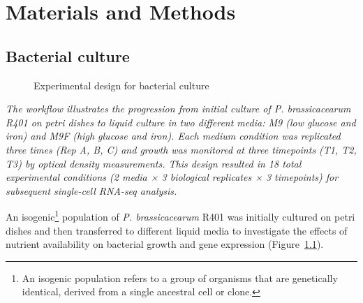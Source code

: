 \documentclass[
  11pt,
  a4paper,
]{report}
\begin{document}

\chapter{Materials and Methods}\label{sec-materials-and-methods}

\section{Bacterial culture}\label{bacterial-culture}

\begin{figure}


\caption{\label{fig-experimental-design}Experimental design for
bacterial culture}

\end{figure}%

\emph{The workflow illustrates the progression from initial culture of
P. brassicacearum R401 on petri dishes to liquid culture in two
different media: M9 (low glucose and iron) and M9F (high glucose and
iron). Each medium condition was replicated three times (Rep A, B, C)
and growth was monitored at three timepoints (T1, T2, T3) by optical
density measurements. This design resulted in 18 total experimental
conditions (2 media × 3 biological replicates × 3 timepoints) for
subsequent single-cell RNA-seq analysis.}

An isogenic\footnote{An isogenic population refers to a group of
  organisms that are genetically identical, derived from a single
  ancestral cell or clone.} population of \emph{P. brassicacearum} R401
was initially cultured on petri dishes and then transferred to different
liquid media to investigate the effects of nutrient availability on
bacterial growth and gene expression
(Figure~\ref{fig-experimental-design}).
\end{document}
